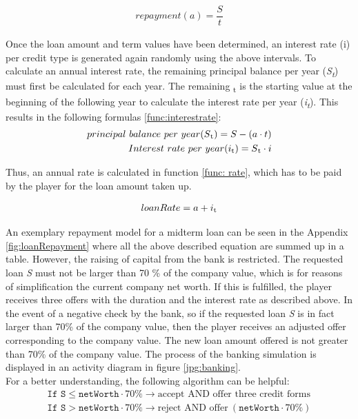 \begin{equation}
\label{func:repayment}
\begin{aligned}
repayment (a)= {\dfrac{S}{t}}
\end{aligned}    
\end{equation}

Once the loan amount and term values have been determined, an interest rate (\gls{i}) per credit type is generated again randomly using the above intervals. To calculate an annual interest rate, the remaining principal balance per year (\textit{S\textsubscript{t}}) must first be calculated for each year. The remaining \textsubscript{t}  is the starting value at the beginning of the following year to calculate the interest rate per year (\textit{i\textsubscript{t}}). This results in the following formulas \ref{func:interestrate}:
\begin{equation}
\label{func:interestrate}
\begin{aligned}
principal \ balance \ per \ year (S\textsubscript{t})= S- (a \cdot t)\\
Interest \ rate \ per \ year (i\textsubscript{t}) = S\textsubscript{t} \cdot i
\end{aligned}    
\end{equation}

Thus, an annual rate is calculated in function \ref{func: rate}, which has to be paid by the player for the loan amount taken up.

\begin{equation}
\label{func: rate}
\begin{aligned}
loanRate = a+ i\textsubscript{t}
\end{aligned}    
\end{equation}

An exemplary repayment model for a midterm loan can be seen in the Appendix \ref{fig:loanRepayment} where all the above described equation are summed up in a table.
However, the raising of capital from the bank is restricted.
The requested loan \textit{S} must not be larger than 70 \% of the company value, which is for reasons of simplification the current company net worth. If this is fulfilled, the player receives three offers with the duration and the interest rate as described above. In the event of a negative check by the bank, so if the requested loan \textit{S} is in fact larger than 70\% of the company value, then the player receives an adjusted offer corresponding to the company value. The new loan amount offered is not greater than 70\% of the company value. The process of the banking simulation is displayed in an activity diagram in figure \ref{jpg:banking}.\\
For a better understanding, the following algorithm can be helpful:
\begin{equation}
    \begin{aligned}
         \texttt{If S} \leq \texttt{netWorth} \cdot 70\%  \xrightarrow{} \text{accept AND offer three credit forms} \\
         \texttt{If S} > \texttt{netWorth} \cdot 70\%  \xrightarrow{} \text{reject AND offer} \ (\texttt{netWorth} \cdot 70\%)
    \end{aligned}    
\end{equation}


